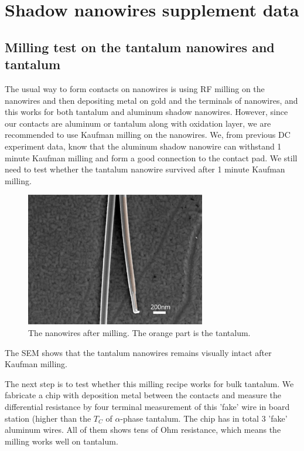 \chapter{Shadow nanowires supplement data} 
\section{Milling test on the tantalum nanowires and tantalum}

The usual way to form contacts on nanowires is using RF milling on the nanowires and then depositing metal on gold and the terminals of nanowires, and this works for both tantalum and aluminum shadow nanowires.   However, since our contacts are aluminum or tantalum along with oxidation layer, we are recommended to use Kaufman milling on the nanowires. We, from previous DC experiment data, know that the aluminum shadow nanowire can withstand 1 minute Kaufman milling and form a good connection to the contact pad. We still need to test whether the tantalum nanowire survived after 1 minute Kaufman milling.
\begin{figure}[h!]
    \centering
    \includegraphics[width=0.7\textwidth]{Pic/Millingtest.jpg}
    \caption{The nanowires after milling. The orange part is the tantalum.}
    \label{fig:my_label}
\end{figure}
The SEM shows that the tantalum nanowires remains visually intact after Kaufman milling. 

The next step is to test whether this milling recipe works for bulk tantalum. We fabricate a chip with deposition metal between the contacts and measure the differential resistance by four terminal measurement of this 'fake' wire in board station (higher than the $T_C$ of $\alpha$-phase tantalum. The chip has in total 3 'fake' aluminum wires. All of them shows tens of Ohm resistance, which means the milling works well on tantalum.  

